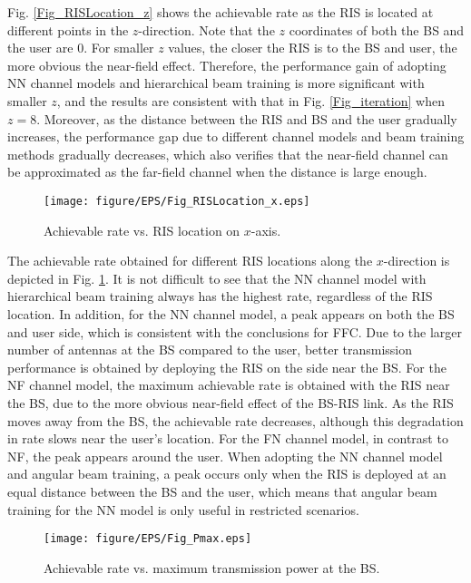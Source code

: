 \documentclass[lettersize, journal]{IEEEtran}
\begin{document}
Fig. {\ref{Fig_RISLocation_z}} shows the achievable rate as the RIS is located at different points in the $z$-direction.
Note that the $z$ coordinates of both the BS and the user are 0.
For smaller $z$ values, the closer the RIS is to the BS and user, the more obvious the near-field effect.
Therefore, the performance gain of adopting NN channel models and hierarchical beam training is more significant with smaller $z$, and the results are consistent with that in Fig. {\ref{Fig_iteration}} when $z=8$.
Moreover, as the distance between the RIS and BS and the user gradually increases, the performance gap due to different channel models and beam training methods gradually decreases, which also verifies that the near-field channel can be approximated as the far-field channel when the distance is large enough.


\begin{figure}[t]
\centering
\texttt{[image: figure/EPS/Fig\_RISLocation\_x.eps]}
\caption{Achievable rate vs. RIS location on $x$-axis.}
\label{Fig_RISLocation_x}
\end{figure}


The achievable rate obtained for different RIS locations along the $x$-direction is depicted in Fig. {\ref{Fig_RISLocation_x}}. 
It is not difficult to see that the NN channel model with hierarchical beam training always has the highest rate, regardless of the RIS location.
In addition, for the NN channel model, a peak appears on both the BS and user side, which is consistent with the conclusions for FFC.
Due to the larger number of antennas at the BS compared to the user, better transmission performance is obtained by deploying the RIS on the side near the BS.
For the NF channel model, the maximum achievable rate is obtained with the RIS near the BS, due to the more obvious near-field effect of the BS-RIS link.
As the RIS moves away from the BS, the achievable rate decreases, although this degradation in rate slows near the user's location.
For the FN channel model, in contrast to NF, the peak appears around the user.
When adopting the NN channel model and angular beam training, a peak occurs only when the RIS is deployed at an equal distance between the BS and the user, which means that angular beam training for the NN model is only useful in restricted scenarios.



\begin{figure}[t]
\centering
\texttt{[image: figure/EPS/Fig\_Pmax.eps]}
\caption{Achievable rate vs. maximum transmission power at the BS.}
\label{Fig_Pmax}
\end{figure}
\end{document}
